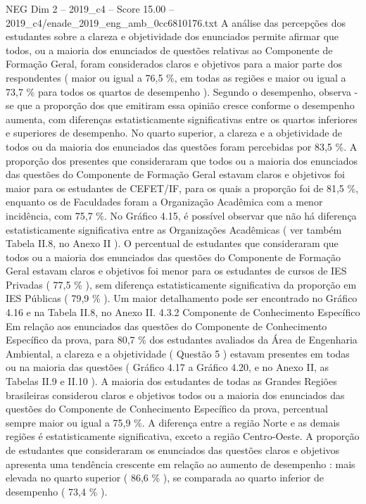 \begin{textsample}{NEG Dim 2 – 2019\_c4 – Score 15.00 – 2019\_c4/enade\_2019\_eng\_amb\_0cc6810176.txt}
A análise das percepções dos estudantes sobre a clareza e objetividade dos enunciados permite afirmar que todos, ou a maioria dos enunciados de questões relativas ao Componente de Formação Geral, foram considerados claros e objetivos para a maior parte dos respondentes ( maior ou igual a 76,5 \%, em todas as regiões e maior ou igual a 73,7 \% para todos os quartos de desempenho ).
Segundo o desempenho, observa -se que a proporção dos que emitiram essa opinião cresce conforme o desempenho aumenta, com diferenças estatisticamente significativas entre os quartos inferiores e superiores de desempenho.
No quarto superior, a clareza e a objetividade de todos ou da maioria dos enunciados das questões foram percebidas por 83,5 \%.
A proporção dos presentes que consideraram que todos ou a maioria dos enunciados das questões do Componente de Formação Geral estavam claros e objetivos foi maior para os estudantes de CEFET/IF, para os quais a proporção foi de 81,5 \%, enquanto os de Faculdades foram a Organização Acadêmica com a menor incidência, com 75,7 \%.
No Gráfico 4.15, é possível observar que não há diferença estatisticamente significativa entre as Organizações Acadêmicas ( ver também Tabela II.8, no Anexo II ).
O percentual de estudantes que consideraram que todos ou a maioria dos enunciados das questões do Componente de Formação Geral estavam claros e objetivos foi menor para os estudantes de cursos de IES Privadas ( 77,5 \% ), sem diferença estatisticamente significativa da proporção em IES Públicas ( 79,9 \% ).
Um maior detalhamento pode ser encontrado no Gráfico 4.16 e na Tabela II.8, no Anexo II. 4.3.2 Componente de Conhecimento Específico Em relação aos enunciados das questões do Componente de Conhecimento Específico da prova, para 80,7 \% dos estudantes avaliados da Área de Engenharia Ambiental, a clareza e a objetividade ( Questão 5 ) estavam presentes em todas ou na maioria das questões ( Gráfico 4.17 a Gráfico 4.20, e no Anexo II, as Tabelas II.9 e II.10 ).
A maioria dos estudantes de todas as Grandes Regiões brasileiras considerou claros e objetivos todos ou a maioria dos enunciados das questões do Componente de Conhecimento Específico da prova, percentual sempre maior ou igual a 75,9 \%.
A diferença entre a região Norte e as demais regiões é estatisticamente significativa, exceto a região Centro-Oeste.
A proporção de estudantes que consideraram os enunciados das questões claros e objetivos apresenta uma tendência crescente em relação ao aumento de desempenho : mais elevada no quarto superior ( 86,6 \% ), se comparada ao quarto inferior de desempenho ( 73,4 \% ).

\end{textsample}
